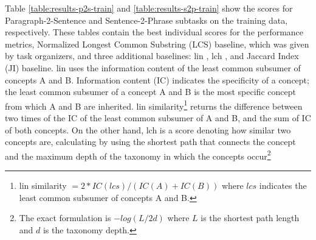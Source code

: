 \documentclass[11pt]{article}
\begin{document}
Table \ref{table:results-p2s-train} and \ref{table:results-s2p-train} show the scores for Paragraph-2-Sentence and Sentence-2-Phrase subtasks on the training data, respectively. These tables contain the best individual scores for the performance metrics, Normalized Longest Common Substring (LCS) baseline, which was given by task organizers, and three additional baselines: lin \cite{lin1998information}, lch \cite{leacock1998combining}, and Jaccard Index (JI) baseline. lin uses the information content \cite{resnik1995inforcontent} of the least common subsumer  of concepts A and B. Information content (IC) indicates the specificity of a concept; the least common subsumer of a concept A and B is the most specific concept from which A and B are inherited. lin similarity\footnote{lin similarity $=  2 * IC(lcs) / (IC(A) + IC(B))$ where $lcs$ indicates the least common subsumer of concepts A and B.} returns the difference between two times of the IC of the least common subsumer of A and B, and the sum of IC of both 
concepts. On the other hand, lch is a score denoting how similar two concepts are, calculating by using the shortest path that connects the concept and the maximum depth of the taxonomy in which the concepts occur\footnote{The exact formulation is $-log(L/2d)$ where $L$ is the shortest path length and $d$ is the taxonomy depth.} 
\begin{table}[hl]
\begin{center}
\end{center}
\caption{\label{table:results-p2s} Paragraph-2-Sentence subtask scores for the test data. \emph{Best} indicates the best correlation score for the subtask. LCS stands for Normalized Longest Common Substring. Subscripts in AI-KU systems specify the run number.}
\end{table}
\end{document}
